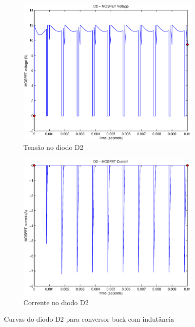 \documentclass{article}
\begin{document}
\begin{figure}[H]
	\centering
	\begin{subfigure}[b]{0.4\linewidth}
		\includegraphics[width=\linewidth]{matlab/buck/r_d2v2}
		\caption{Tensão no diodo D2}
	\end{subfigure}
	\begin{subfigure}[b]{0.4\linewidth}
		\centering
		\includegraphics[width=\linewidth]{matlab/buck/r_d2i2}
		\caption{Corrente no diodo D2}
	\end{subfigure}
	\caption{Curvas do diodo D2 para conversor buck com indutância }
	\label{fig:bd22}
\end{figure}
\end{document}

